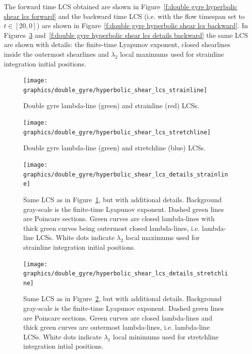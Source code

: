 \documentclass{article}
\begin{document}
The forward time LCS obtained are shown in Figure~\ref{f:double gyre hyperbolic shear lcs forward} and the backward time LCS (i.e. with the flow timespan set to $t \in [20,0]$) are shown in Figure~\ref{f:double gyre hyperbolic shear lcs backward}. In Figures~\ref{f:double gyre hyperbolic shear lcs details forward} and~\ref{f:double gyre hyperbolic shear lcs details backward} the same LCS are shown with details: the finite-time Lyapunov exponent, closed shearlines inside the outermost shearlines and $\lambda_2$ local maximums used for strainline integration initial positions.

\begin{figure}
\begin{center}
\texttt{[image: graphics/double\_gyre/hyperbolic\_shear\_lcs\_strainline]}
\end{center}
\caption{Double gyre lambda-line (green) and strainline (red) LCSs.}
\label{f:double gyre hyperbolic shear lcs strainline}
\end{figure}

\begin{figure}
\begin{center}
\texttt{[image: graphics/double\_gyre/hyperbolic\_shear\_lcs\_stretchline]}
\end{center}
\caption{Double gyre lambda-line (green) and stretchline (blue) LCSs.}
\label{f:double gyre hyperbolic shear lcs stretchline}
\end{figure}

\begin{figure}
\begin{center}
\texttt{[image: graphics/double\_gyre/hyperbolic\_shear\_lcs\_details\_strainline]}
\end{center}
\caption{Same LCS as in Figure~\ref{f:double gyre hyperbolic shear lcs strainline}, but with additional details. Background gray-scale is the finite-time Lyapunov exponent. Dashed green lines are Poincare sections. Green curves are closed lambda-lines with thick green curves being outermost closed lambda-lines, i.e. lambda-line LCSs. White dots indicate $\lambda_2$ local maximums used for strainline integration initial positions.}
\label{f:double gyre hyperbolic shear lcs details forward}
\end{figure}

\begin{figure}
\begin{center}
\texttt{[image: graphics/double\_gyre/hyperbolic\_shear\_lcs\_details\_stretchline]}
\end{center}
\caption{Same LCS as in Figure~\ref{f:double gyre hyperbolic shear lcs stretchline}, but with additional details. Background gray-scale is the finite-time Lyapunov exponent. Dashed green lines are Poincare sections. Green curves are closed lambda-lines and thick green curves are outermost lambda-lines, i.e. lambda-line LCSs. White dots indicate $\lambda_1$ local minimums used for stretchline integration intial positions.}
\label{f:double gyre hyperbolic shear lcs details stretchline}
\end{figure}
\end{document}
